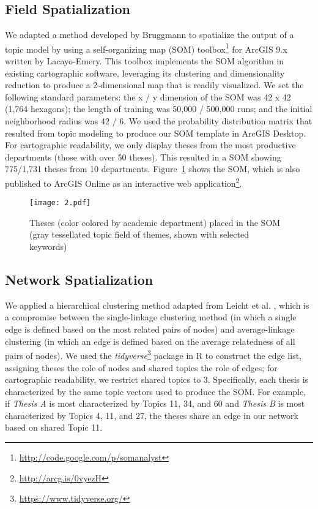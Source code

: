\documentclass[a4paper,UKenglish]{lipics-v2018}
\begin{document}
\subsection{Field Spatialization}
We adapted a method developed by Bruggmann to spatialize the output of a topic model \cite{Bruggmann2016b} by using a self-organizing map (SOM) toolbox\footnote{\url{http://code.google.com/p/somanalyst}} for ArcGIS 9.x written by Lacayo-Emery. This toolbox implements the SOM algorithm \cite{Kohonen1995a} in existing cartographic software, leveraging its clustering and dimensionality reduction to produce a 2-dimensional map that is readily visualized.
We set the following standard parameters: the x / y dimension of the SOM was 42 x 42 (1,764 hexagons); the length of training was 50,000 / 500,000 runs; and the initial neighborhood radius was 42 / 6. We used the probability distribution matrix that resulted from topic modeling to produce our SOM template in ArcGIS Desktop. For cartographic readability, we only display theses from the most productive departments (those with over 50 theses). This resulted in a SOM showing 775/1,731 theses from 10 departments. Figure~\ref{fig:SOM} shows the SOM, which is also published to ArcGIS Online as an interactive web application\footnote{\url{http://arcg.is/0vyezH}}.

\begin{figure}[ht]
    \centering
    \texttt{[image: 2.pdf]}
    \caption{Theses (color colored by academic department) placed in the SOM (gray tessellated topic field of themes, shown with selected keywords) }
    \label{fig:SOM}
\end{figure}

\subsection{Network Spatialization}
We applied a hierarchical clustering method adapted from Leicht et al. \cite{Leicht}, which is a compromise between the single-linkage clustering method (in which a single edge is defined based on the most related pairs of nodes) and average-linkage clustering (in which an edge is defined based on the average relatedness of all pairs of nodes). We used the \textit{tidyverse}\footnote{\url{https://www.tidyverse.org/}} package in R to construct the edge list, assigning theses the role of nodes and shared topics the role of edges; for cartographic readability, we restrict shared topics to 3.
Specifically, each thesis is characterized by the same topic vectors used to produce the SOM. For example, if \textit{Thesis A} is most characterized by Topics 11, 34, and 60 and  \textit{Thesis B} is most characterized by Topics 4, 11, and 27, the theses share an edge in our network based on shared Topic 11. 
\end{document}
